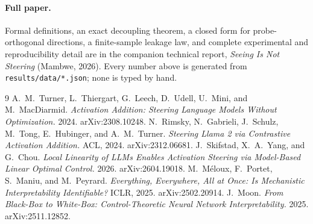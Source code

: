 \documentclass[9pt]{extarticle}
\begin{document}
\paragraph{Full paper.} Formal definitions, an exact decoupling theorem, a
closed form for probe-orthogonal directions, a finite-sample leakage law,
and complete experimental and reproducibility detail are in the companion
technical report, \emph{Seeing Is Not Steering} (Mambwe, 2026). Every
number above is generated from \texttt{results/data/*.json}; none is typed
by hand.

\begin{thebibliography}{9}
\small
{}
A.~M.~Turner, L.~Thiergart, G.~Leech, D.~Udell, U.~Mini, and M.~MacDiarmid.
\emph{Activation Addition: Steering Language Models Without Optimization.}
2024. arXiv:2308.10248.
N.~Rimsky, N.~Gabrieli, J.~Schulz, M.~Tong, E.~Hubinger, and A.~M.~Turner.
\emph{Steering Llama 2 via Contrastive Activation Addition.} ACL, 2024.
arXiv:2312.06681.
J.~Skifstad, X.~A.~Yang, and G.~Chou. \emph{Local Linearity of LLMs Enables
Activation Steering via Model-Based Linear Optimal Control.} 2026.
arXiv:2604.19018.
M.~Méloux, F.~Portet, S.~Maniu, and M.~Peyrard. \emph{Everything, Everywhere,
All at Once: Is Mechanistic Interpretability Identifiable?} ICLR, 2025.
arXiv:2502.20914.
J.~Moon. \emph{From Black-Box to White-Box: Control-Theoretic Neural Network
Interpretability.} 2025. arXiv:2511.12852.
\end{thebibliography}
\end{document}
